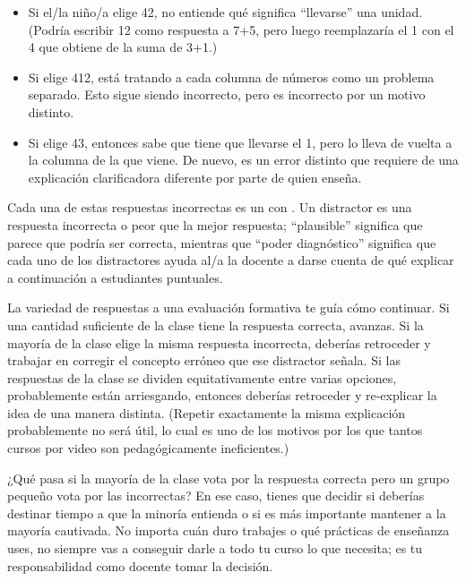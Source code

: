 \begin{itemize}

\item
  Si el/la niño/a elige 42,
no entiende qué significa ``llevarse'' una unidad.
(Podría escribir 12 como respuesta a 7+5,
pero luego reemplazaría el 1 con el 4 que obtiene de la suma de 3+1.)
\item
 Si elige 412,
está tratando a cada columna de números como un problema separado.
Esto sigue siendo incorrecto,
pero es incorrecto por un motivo distinto.

\item
Si elige 43, entonces sabe que tiene que llevarse el 1,
pero lo lleva de vuelta a la columna de la que viene.
De nuevo,
es un error distinto
que requiere de una explicación clarificadora diferente por parte de quien enseña.  
\end{itemize}

Cada una de estas respuestas incorrectas es un 
con .
Un distractor es una respuesta incorrecta o peor que la mejor respuesta;
``plausible'' significa que parece que podría ser correcta,
mientras que ``poder diagnóstico'' significa que cada uno de los distractores ayuda al/a la docente a darse cuenta de qué explicar a continuación a estudiantes puntuales.

La variedad de respuestas a una evaluación formativa te guía cómo continuar.
Si una cantidad suficiente de la clase tiene la respuesta correcta, avanzas.
Si la mayoría de la clase elige la misma respuesta incorrecta,
deberías retroceder y trabajar en corregir el concepto erróneo que ese distractor señala.
Si las respuestas de la clase se dividen equitativamente entre varias opciones, probablemente están arriesgando, entonces deberías retroceder y re-explicar la idea de una manera distinta.
(Repetir exactamente la misma explicación probablemente no será útil,
lo cual es uno de los motivos por los que tantos cursos por video son pedagógicamente ineficientes.)

¿Qué pasa si la mayoría de la clase vota por la respuesta correcta
pero un grupo pequeño vota por las incorrectas?
En ese caso, 
tienes que decidir si deberías destinar tiempo a que la minoría entienda
o si es más importante mantener a la mayoría cautivada.
No importa cuán duro trabajes o qué prácticas de enseñanza uses,
no siempre vas a conseguir darle a todo tu curso lo que necesita;
es tu responsabilidad como docente tomar la decisión.

